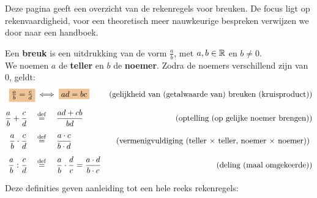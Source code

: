 \documentclass{ximera}
\begin{document}
	\author{Wiskundeplan}

Deze pagina geeft een overzicht van de rekenregels voor breuken. 
De focus ligt op rekenvaardigheid, voor een theoretisch meer nauwkeurige bespreken verwijzen we door naar een handboek. 


\begin{definition}\label{def:breuken}\nl
 
Een \textbf{breuk} is een uitdrukking van de vorm $\frac ab$,  met $a,b\in\mathbb{R}$  en $b\neq0$.
\\[2mm]
We noemen $a$ de \textbf{teller} en $b$ de \textbf{noemer}.
Zodra de noemers verschillend zijn van $0$, geldt:
\begin{align*}
        \important{\frac{a}{b} = \frac{c}{d}}  &\iff \important{ad = bc}
             &\text{(gelijkheid van (getalwaarde van) breuken (kruisproduct))}
             \\[2mm]
        \frac{a}{b}+\frac{c}{d} \quad&\perdef\quad \frac{ad+cb}{bd}
             &\text{ (optelling (op gelijke noemer brengen))}
             \\[2mm]
        \frac{a}{b} \cdot \frac{c}{d} \quad&\perdef\quad \frac{a\cdot c}{b\cdot d}
             &\text{(vermenigvuldiging (teller $\times$ teller, noemer $\times$ noemer)) }
             \\[2mm]
        \frac{a}{b} : \frac{c}{d} \quad&\perdef\quad \frac ab \cdot \frac dc = \frac{a\cdot d}{b\cdot c}
             &\text{(deling (maal omgekeerde))}
\end{align*}

\end{definition}



Deze definities geven aanleiding tot een hele reeks rekenregels: 
\end{document}

